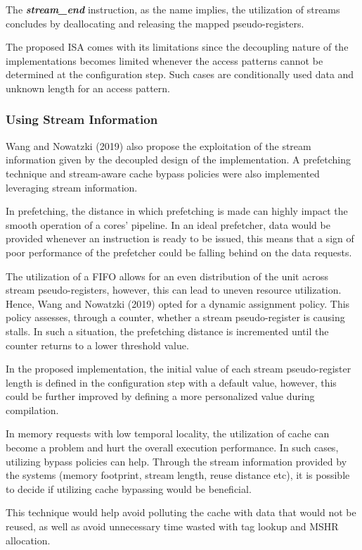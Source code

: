 The \textbf{\textit{stream\_end}} instruction, as the name implies, the utilization of streams concludes by deallocating and releasing the mapped pseudo-registers.

The proposed \acrshort{ISA} comes with its limitations since the decoupling nature of the implementations becomes limited whenever the access patterns cannot be determined at the configuration step. Such cases are conditionally used data and unknown length for an access pattern.


\subsubsection{Using Stream Information}
Wang and Nowatzki (2019) \cite{8980305} also propose the exploitation of the stream information given by the decoupled design of the implementation. A prefetching technique and stream-aware cache bypass policies were also implemented leveraging stream information.

In prefetching, the distance in which prefetching is made can highly impact the smooth operation of a cores' pipeline. In an ideal prefetcher, data would be provided whenever an instruction is ready to be issued, this means that a sign of poor performance of the prefetcher could be falling behind on the data requests.

The utilization of a FIFO allows for an even distribution of the unit across stream pseudo-registers, however, this can lead to uneven resource utilization. Hence, Wang and Nowatzki (2019) \cite{8980305} opted for a dynamic assignment policy. This policy assesses, through a counter, whether a stream pseudo-register is causing stalls. In such a situation, the prefetching distance is incremented until the counter returns to a lower threshold value.

In the proposed implementation, the initial value of each stream pseudo-register length is defined in the configuration step with a default value, however, this could be further improved by defining a more personalized value during compilation.


In memory requests with low temporal locality, the utilization of cache can become a problem and hurt the overall execution performance. In such cases, utilizing bypass policies can help. 
Through the stream information provided by the systems (memory footprint, stream length, reuse distance etc),  it is possible to decide if utilizing cache bypassing would be beneficial.

This technique would help avoid polluting the cache with data that would not be reused, as well as avoid unnecessary time wasted with tag lookup and MSHR allocation.


